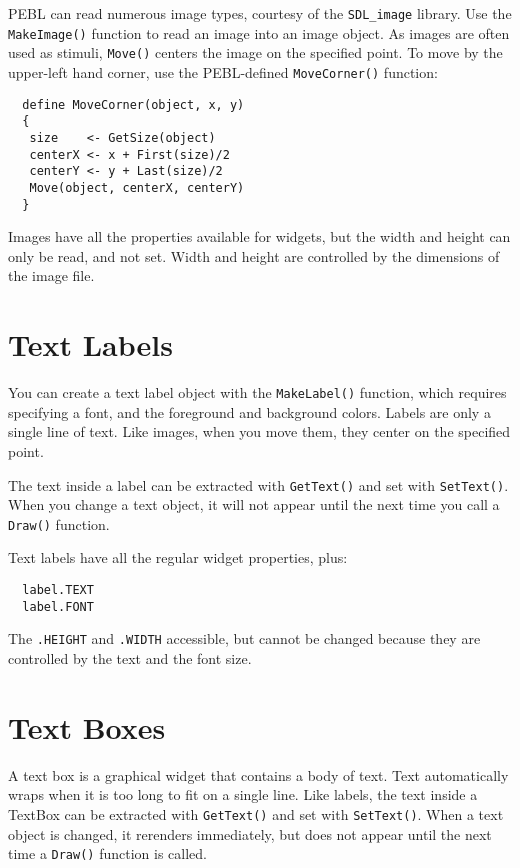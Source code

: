 PEBL can read numerous image types, courtesy of the
\texttt{SDL\_image} library.  Use the \texttt{MakeImage()} function to
read an image into an image object.  As images are often used as
stimuli, \texttt{Move()} centers the image on the specified point.  To
move by the upper-left hand corner, use the PEBL-defined
\texttt{MoveCorner()} function:
\begin{verbatim}
  define MoveCorner(object, x, y)
  {
   size    <- GetSize(object)
   centerX <- x + First(size)/2
   centerY <- y + Last(size)/2
   Move(object, centerX, centerY)
  }
\end{verbatim}

Images have all the properties available for widgets, but the width
and height can only be read, and not set.  Width and height are
controlled by the dimensions of the image file.


\section{Text Labels}

You can create a text label object with the \texttt{MakeLabel()} function, 
which requires specifying a font, and the foreground and background colors.  Labels are only a single line of text. Like images, when you move them,
they center on the specified point.

The text inside a label can be extracted with \texttt{GetText()} 
and set with \texttt{SetText()}. When you change a text object, 
it will not appear until the next time you call a \texttt{Draw()} function.

Text labels have all the regular widget properties, plus:
\begin{verbatim}
  label.TEXT 
  label.FONT
\end{verbatim}
  


The \verb+.HEIGHT+ and \verb+.WIDTH+ accessible, but cannot be changed
because they are controlled by the text and the font size.


\section{Text Boxes}

A text box is a graphical widget that contains a body of text.  Text
automatically wraps when it is too long to fit on a single line.  Like
labels, the text inside a TextBox can be extracted with
\texttt{GetText()} and set with \texttt{SetText()}. When a text object
is changed, it rerenders immediately, but does not appear until the
next time a \texttt{Draw()} function is called.


